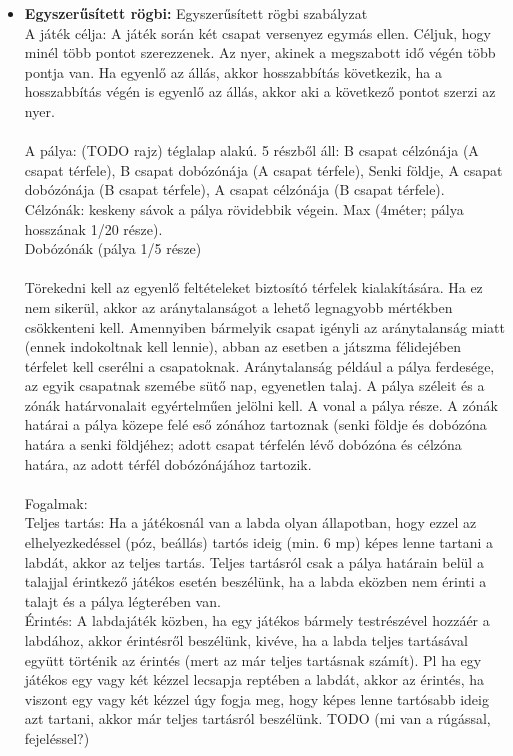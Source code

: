 \documentclass[a4paper, 12pt, twoside, openright]{article}
\begin{document}
\begin{itemize}
\item \textbf{Egyszerűsített rögbi:} Egyszerűsített rögbi szabályzat\\
A játék célja: A játék során két csapat versenyez egymás ellen. Céljuk, hogy minél több pontot szerezzenek. Az nyer, akinek a megszabott idő végén több pontja van. Ha egyenlő az állás, akkor hosszabbítás következik, ha a hosszabbítás végén is egyenlő az állás, akkor aki a következő pontot szerzi az nyer.\\
\\
A pálya: (TODO rajz) téglalap alakú. 5 részből áll:
B csapat célzónája (A csapat térfele), B csapat dobózónája (A csapat térfele), Senki földje, A csapat dobózónája (B csapat térfele), A csapat célzónája (B csapat térfele).\\
Célzónák: keskeny sávok a pálya rövidebbik végein. Max (4méter; pálya hosszának 1/20 része).\\
Dobózónák (pálya 1/5 része)\\
\\
Törekedni kell az egyenlő feltételeket biztosító térfelek kialakítására. Ha ez nem sikerül, akkor az aránytalanságot a lehető legnagyobb mértékben csökkenteni kell. Amennyiben bármelyik csapat igényli az aránytalanság miatt (ennek indokoltnak kell lennie), abban az esetben a játszma félidejében térfelet kell cserélni a csapatoknak. Aránytalanság például a pálya ferdesége, az egyik csapatnak szemébe sütő nap, egyenetlen talaj.
A pálya széleit és a zónák határvonalait egyértelműen jelölni kell. A vonal a pálya része. A zónák határai a pálya közepe felé eső zónához tartoznak (senki földje és dobózóna határa a senki földjéhez; adott csapat térfelén lévő dobózóna és célzóna határa, az adott térfél dobózónájához tartozik.\\
\\
Fogalmak:\\
Teljes tartás: Ha a játékosnál van a labda olyan állapotban, hogy ezzel az elhelyezkedéssel (póz, beállás) tartós ideig (min. 6 mp) képes lenne tartani a labdát, akkor az teljes tartás. Teljes tartásról csak a pálya határain belül a talajjal érintkező játékos esetén beszélünk, ha a labda eközben nem érinti a talajt és a pálya légterében van.\\
Érintés: A labdajáték közben, ha egy játékos bármely testrészével hozzáér a labdához, akkor érintésről beszélünk, kivéve, ha a labda teljes tartásával együtt történik az érintés (mert az már teljes tartásnak számít). Pl ha egy játékos egy vagy két kézzel lecsapja reptében a labdát, akkor az érintés, ha viszont egy vagy két kézzel úgy fogja meg, hogy képes lenne tartósabb ideig azt tartani, akkor már teljes tartásról beszélünk. TODO (mi van a rúgással, fejeléssel?)

\end{itemize}
\end{document}
